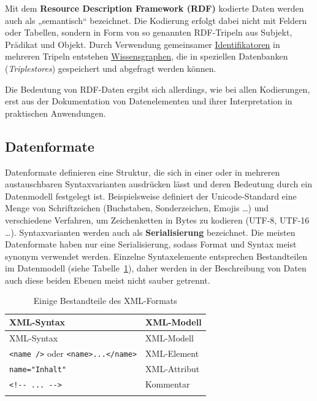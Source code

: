 \documentclass[
  11pt,
  letterpaper,
  DIV=11,
  twoside]{scrreprt}
\begin{document}
\begin{tcolorbox}[enhanced jigsaw, leftrule=.75mm, toprule=.15mm, left=2mm, opacityback=0, arc=.35mm, colback=white, breakable, colframe=quarto-callout-tip-color-frame, rightrule=.15mm, bottomrule=.15mm]
\begin{minipage}[t]{5.5mm}
\textcolor{quarto-callout-tip-color}{\faLightbulb}
\end{minipage}%
\begin{minipage}[t]{\textwidth - 5.5mm}

Mit dem \textbf{Resource Description Framework (RDF)} kodierte Daten
werden auch als „semantisch`` bezeichnet. Die Kodierung erfolgt dabei
nicht mit Feldern oder Tabellen, sondern in Form von so genannten
RDF-Tripeln aus Subjekt, Prädikat und Objekt. Durch Verwendung
gemeinsamer \hyperref[identifikatoren]{Identifikatoren} in mehreren
Tripeln entstehen
\hyperref[datenmodelle-und-ontologien]{Wissensgraphen}, die in
speziellen Datenbanken (\emph{Triplestores}) gespeichert und abgefragt
werden können.

Die Bedeutung von RDF-Daten ergibt sich allerdings, wie bei allen
Kodierungen, erst aus der Dokumentation von Datenelementen und ihrer
Interpretation in praktischen Anwendungen.

\end{minipage}%
\end{tcolorbox}

\subsection{Datenformate}\label{datenformate}

Datenformate definieren eine Struktur, die sich in einer oder in
mehreren austauschbaren Syntaxvarianten ausdrücken lässt und deren
Bedeutung durch ein Datenmodell festgelegt ist. Beispielsweise definiert
der Unicode-Standard eine Menge von Schriftzeichen (Buchstaben,
Sonderzeichen, Emojis \ldots) und verschiedene Verfahren, um
Zeichenketten in Bytes zu kodieren (UTF-8, UTF-16 \ldots).
Syntaxvarianten werden auch als \textbf{Serialisierung} bezeichnet. Die
meisten Datenformate haben nur eine Serialisierung, sodass Format und
Syntax meist synonym verwendet werden. Einzelne Syntaxelemente
entsprechen Bestandteilen im Datenmodell (siehe Tabelle~\ref{tbl-xml}),
daher werden in der Beschreibung von Daten auch diese beiden Ebenen
meist nicht sauber getrennt.

\begin{longtable}[]{@{}ll@{}}
\toprule\noalign{}
XML-Syntax & XML-Modell \\
\midrule\noalign{}
\endfirsthead
\toprule\noalign{}
XML-Syntax & XML-Modell \\
\midrule\noalign{}
\endhead
\bottomrule\noalign{}
\endlastfoot
\texttt{\textless{}name\ /\textgreater{}} oder
\texttt{\textless{}name\textgreater{}...\textless{}/name\textgreater{}}
& XML-Element \\
\texttt{name="Inhalt"} & XML-Attribut \\
\texttt{\textless{}!-\/-\ ...\ -\/-\textgreater{}} & Kommentar \\
\caption{Einige Bestandteile des
XML-Formats}\label{tbl-xml}\tabularnewline
\end{longtable}
\end{document}
